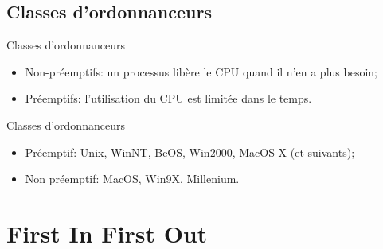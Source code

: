 \begin{frame}{\sectitle}

\def\subsectitle{Classes d'ordonnanceurs}
\subsection{\subsectitle}

\begin{block}{\subsectitle}
\begin{itemize}
    \item Non-préemptifs: un processus libère le CPU quand il n'en a plus
    besoin;
    \item Préemptifs: l'utilisation du CPU est limitée dans le temps.
\end{itemize}
\end{block}

\begin{exampleblock}{\subsectitle}
\begin{itemize}
    \item Préemptif: Unix, WinNT, BeOS, Win2000, MacOS X (et suivants);
        \item Non préemptif: MacOS, Win9X, Millenium.
\end{itemize}
\end{exampleblock}

\end{frame}

\def\sectitle{First In First Out}
\section{\sectitle}

